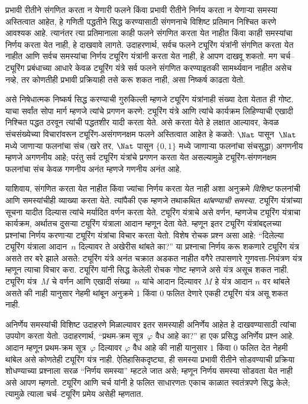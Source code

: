 प्रभावी रीतीने संगणित करता न येणारी फलने किंवा प्रभावी
रीतीने निर्णय करता न येणाऱ्या समस्या अस्तित्वात आहेत,
हे गणिती पद्धतीने सिद्ध करण्यासाठी संगणनाचे विशिष्ट
प्रतिमान निश्चित करणे आवश्यक आहे. त्यानंतर त्या
प्रतिमानाला काही फलने संगणित करता येत नाहीत किंवा
काही समस्यांचा निर्णय करता येत नाही, हे दाखवावे लागते.
उदाहरणार्थ, सर्वच फलने ट्यूरिंग यंत्रांनी संगणित करता
येत नाहीत आणि सर्वच समस्यांचा निर्णय ट्यूरिंग यंत्रांनी
करता येत नाही, हे आपण दाखवू शकतो. मग चर्च--ट्यूरिंग
प्रबंधाच्या आधारे केवळ ट्यूरिंग यंत्रे सर्व फलने संगणित
करण्याइतकी सामर्थ्यवान नाहीत असेच नव्हे, तर कोणतीही
प्रभावी प्रक्रियाही तसे करू शकत नाही, असा निष्कर्ष
काढता येतो.

असे निषेधात्मक निष्कर्ष सिद्ध करण्याची गुरुकिल्ली म्हणजे
ट्यूरिंग यंत्रांनाही संख्या देता येतात ही गोष्ट. याचा
सर्वांत सोपा मार्ग म्हणजे त्यांचे प्रगणन करणे: ट्यूरिंग
यंत्रे आणि त्यांचे कार्यक्रम लिहिण्याची एखादी निश्चित
पद्धत ठरवून त्यांची पद्धतशीर यादी करता येते. असे
करता येते हे लक्षात आल्यावर, केवळ संचसंख्येच्या
विचारांवरून ट्यूरिंग-असंगणनक्षम फलने अस्तित्वात आहेत
हे कळते: $\Nat$ पासून~$\Nat$ मध्ये जाणाऱ्या फलनांचा
संच (खरे तर, $\Nat$ पासून $\{0, 1\}$ मध्ये जाणाऱ्या
फलनांचा संचसुद्धा) अगणनीय म्हणजे अगणनीय
आहे; परंतु सर्व ट्यूरिंग यंत्रांचे प्रगणन करता येत
असल्यामुळे ट्यूरिंग-संगणनक्षम फलनांचा संच केवळ
गणनीय अनंत म्हणजे गणनीय अनंत आहे.

याशिवाय, संगणित करता येत नाहीत किंवा ज्यांचा निर्णय
करता येत नाही अशा अनुक्रमे \emph{विशिष्ट} फलनांची
आणि समस्यांचीही व्याख्या करता येते. त्यांपैकी
एक म्हणजे तथाकथित \emph{थांबण्याची समस्या.}
ट्यूरिंग यंत्रांच्या सूचना यादीत दिल्यास त्यांचे
मर्यादित वर्णन करता येते. ट्यूरिंग यंत्राचे असे
वर्णन, म्हणजेच ट्यूरिंग यंत्राचा कार्यक्रम, अर्थातच
दुसऱ्या ट्यूरिंग यंत्राला आदान म्हणून देता येते.
म्हणून इतर ट्यूरिंग यंत्रांबद्दलच्या प्रश्नांचा
निर्णय करणाऱ्या ट्यूरिंग यंत्रांचा विचार करता येतो.
विशेष रोचक प्रश्न असा आहे: “दिलेल्या ट्यूरिंग यंत्राला
आदान~$n$ दिल्यावर ते अखेरीस थांबते का?”
या प्रश्नाचा निर्णय करू शकणारे ट्यूरिंग यंत्र असते
तर बरे झाले असते: ट्यूरिंग यंत्रे अनंत चक्रात अडकत
नाहीत वगैरे तपासणारे गुणवत्ता-नियंत्रण यंत्र म्हणून
त्याचा विचार करा. ट्यूरिंग यांनी सिद्ध केलेली
रोचक गोष्ट म्हणजे असे यंत्र असूच शकत नाही.
ट्यूरिंग यंत्र~$M$ चे वर्णन आणि एखादी
संख्या~$n$ यांचे आदान दिल्यावर $M$ हे यंत्र
आदान $n$ वर थांबले असते की नाही यानुसार नेहमी
थांबून अनुक्रमे $1$ किंवा $0$ फलित देणारे एकही
ट्यूरिंग यंत्र असू शकत नाही.

अनिर्णेय समस्यांची विशिष्ट उदाहरणे मिळाल्यावर इतर
समस्याही अनिर्णेय आहेत हे दाखवण्यासाठी त्यांचा
उपयोग करता येतो. उदाहरणार्थ, “प्रथम-क्रम
सूत्र~$\varphi$ वैध आहे का?” हा एक प्रसिद्ध
अनिर्णेय प्रश्न आहे. आदान म्हणून प्रथम-क्रम
सूत्र~$\varphi$ दिल्यावर $\varphi$ वैध आहे की
नाही यानुसार $1$ किंवा $0$ फलित देत नेहमी
थांबेल असे कोणतेही ट्यूरिंग यंत्र नाही.
ऐतिहासिकदृष्ट्या, ही समस्या प्रभावी रीतीने
सोडवण्याची प्रक्रिया शोधण्याच्या प्रश्नाला
सरळ “निर्णय समस्या” म्हटले जात असे; म्हणून
निर्णय समस्या सोडवता येत नाही असे आपण म्हणतो.
ट्यूरिंग आणि चर्च यांनी हे फलित साधारणतः
एकाच काळात स्वतंत्रपणे सिद्ध केले; त्यामुळे
त्याला चर्च--ट्यूरिंग प्रमेय असेही म्हणतात.











